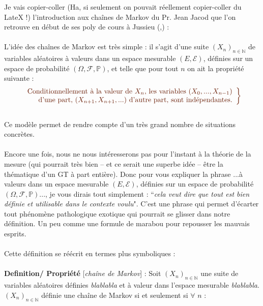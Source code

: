 \documentclass[english]{article}
\begin{document}
Je vais copier-coller (Ha, si seulement on pouvait réellement copier-coller du LateX !) l'introduction aux cha\^ines de Markov du Pr. Jean Jacod que l'on retrouve en début de ses poly de cours à Jussieu (\cite{2},\cite{3}) :\\
\\
\textcolor{marron_noir}{L'idée des cha\^ines de Markov est très simple : il s'agit d'une suite $(X_n)_{n\in \mathbb{N}}$ de variables aléatoires à valeurs dans un espace mesurable $(E,\mathcal{E})$, définies sur un espace de probabilité $(\Omega,\mathcal{F},\mathbb{P})$, et telle que pour tout $n$ on ait la propriété suivante :}\\
\begin{equation}
\textcolor{marron_noir}{\left. \begin{array}{r}
\textcolor{marron_noir}{\text{Conditionnellement à la valeur de $X_n$, les variables $(X_0, ..., X_{n-1})$}}\\
\textcolor{marron_noir}{\text{d'une part, $(X_{n+1},X_{n+1},...)$ d'autre part, sont indépendantes.}}\\
\end{array}\right\rbrace}
\end{equation}
\\
\textcolor{marron_noir}{Ce modèle permet de rendre compte d'un très grand nombre de situations concrètes.}\\
\\
Encore une fois, nous ne nous intéresserons pas pour l'instant à la théorie de la mesure (qui pourrait très bien -- et ce serait une superbe idée -- être la thématique d'un GT à part entière). Donc pour vous expliquer la phrase \textcolor{marron_noir}{...à valeurs dans un espace mesurable $(E,\mathcal{E})$, définies sur un espace de probabilité $(\Omega,\mathcal{F},\mathbb{P})$...}, je vous dirais tout simplement : ``\textit{cela veut dire que tout est bien définie et utilisable dans le contexte voulu}". C'est une phrase qui permet d'écarter tout phénomène pathologique exotique qui pourrait se glisser dans notre définition. Un peu comme une formule de marabou \cite{4} pour repousser les mauvais esprits. \\
\\
Cette définition se réécrit en termes plus symboliques :\\
\\
\textbf{Definition/ Propriété} [\textit{cha\^ine de Markov}] : Soit $(X_n)_{n\in \mathbb{N}}$ une suite de variables aléatoires définies \textit{blablabla} et à valeur dans l'espace mesurable \textit{blablabla}. $(X_n)_{n\in \mathbb{N}}$ définie une cha\^ine de Markov si et seulement si $\forall$ $n$ :
\end{document}
